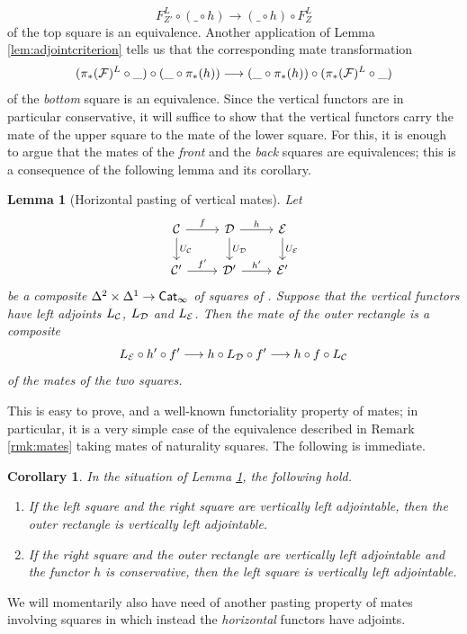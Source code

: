 \documentclass[10pt, reqno, twoside
, final
]{amsart}
\numberwithin{equation}{subsection}%
\theoremstyle{definition}
\theoremstyle{definition}
\theoremstyle{definition}
\theoremstyle{definition}
\theoremstyle{definition}
\theoremstyle{definition}
\theoremstyle{definition}
\theoremstyle{definition}
\theoremstyle{definition}
\theoremstyle{plain}
\theoremstyle{definition}
\theoremstyle{plain}
\theoremstyle{definition}
\theoremstyle{plain}
\newtheorem{cor}[defn]{Corollary}
\theoremstyle{definition}
\theoremstyle{definition}
\theoremstyle{plain}
\newtheorem{lem}[defn]{Lemma}
\theoremstyle{plain}
\theoremstyle{definition}
\theoremstyle{plain}
\theoremstyle{plain}
\theoremstyle{plain}
\begin{document}
\[   F^L_{Z'}\circ (\_\circ h) \longrightarrow (\_\circ h) \circ F^L_Z  \]
of the top square is an equivalence. Another application of Lemma \ref{lem:adjointcriterion} tells us that the corresponding mate transformation 
\[  (\pi_*(\mathcal{F})^L\circ \_)\circ (\_\circ \pi_*(h)) \longrightarrow (\_\circ \pi_*(h)) \circ  (\pi_*(\mathcal{F})^L\circ \_) \]
of the \emph{bottom} square is an equivalence. Since the vertical functors are in particular conservative, it will suffice to show that the vertical functors carry the mate of the upper square to the mate of the lower square. For this, it is enough to argue that the mates of the \emph{front} and the \emph{back} squares are equivalences; this is a consequence of the following lemma and its corollary.
\begin{lem}[Horizontal pasting of vertical mates]\label{lem:pastingofmates}
Let
\[
\begin{tikzcd}
    \icat \ar[d,"U_{\icat}"] \ar[r,"f"] & \icatd \ar[d,"U_{\icatd}"] \ar[r,"h"] & \icate \ar[d,"U_{\icate}"]\\
    \icat'\ar[r,"f'"] &  \icatd' \ar[r,"h'"] & \icate'
\end{tikzcd}
\]
be a composite $\Delta^2\times\Delta^1\rightarrow \mathsf{Cat}_{\infty}$ of squares of \infcatst. Suppose that the vertical functors have left adjoints $L_{\mathcal{C}}$, $L_{\mathcal{D}}$ and $L_{\mathcal{E}}$. Then the mate of the outer rectangle is a composite
\[ L_{\mathcal{E}}\circ h'\circ  f'\longrightarrow h\circ L_{\mathcal{D}}\circ f' \longrightarrow h\circ f\circ L_{\mathcal{C}}   \]
of the mates of the two squares. 
\end{lem}
This is easy to prove, and a well-known functoriality property of mates; in particular, it is a very simple case of the equivalence described in Remark \ref{rmk:mates} taking mates of naturality squares. The following is immediate.
\begin{cor}\label{cor:pastingofmates}
In the situation of Lemma \ref{lem:pastingofmates}, the following hold.
\begin{enumerate}[$(1)$]
    \item If the left square and the right square are vertically left adjointable, then the outer rectangle is vertically left adjointable.
    \item If the right square and the outer rectangle are vertically left adjointable \emph{and} the functor $h$ is conservative, then the left square is vertically left adjointable.
\end{enumerate}
\end{cor}
We will momentarily also have need of another pasting property of mates involving squares in which instead the \emph{horizontal} functors have adjoints.
\end{document}
